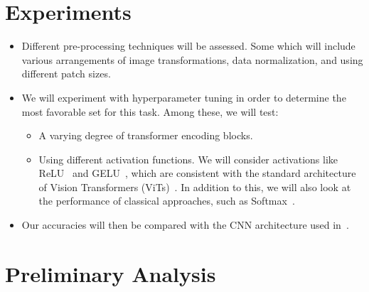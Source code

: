 \documentclass[10pt,twocolumn,letterpaper]{article}
\begin{document}
\section{Experiments}
\begin{itemize}

    \item Different pre-processing techniques will be assessed. Some which will include various arrangements of image transformations, data normalization, and using different patch sizes.
    
    \item We will experiment with hyperparameter tuning in order to determine the most favorable set for this task.  Among these, we will test:

    \begin{itemize}
    
        \item A varying degree of transformer encoding blocks. 

        \item Using different activation functions.  We will consider activations like ReLU~\cite{relu2010} and GELU~\cite{gelu2016}, which are consistent with the standard architecture of Vision Transformers (ViTs)~\cite{an_imageworth}.  In addition to this, we will also look at the performance of classical approaches, such as Softmax~\cite{softmax}.

        
    \end{itemize}

    \item Our accuracies will then be compared with the CNN architecture used in~\cite{ePill}.
\end{itemize}

\section{Preliminary Analysis}
\end{document}
